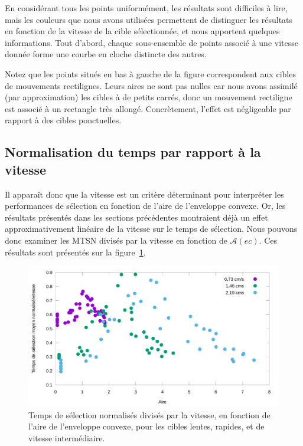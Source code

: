 	En considérant tous les points uniformément, les résultats sont difficiles à lire, mais les couleurs que nous avons utilisées permettent de distinguer les résultats en fonction de la vitesse de la cible sélectionnée, et nous apportent quelques informations. Tout d'abord, chaque sous-ensemble de points associé à une vitesse donnée forme une courbe \og en cloche \fg{} distincte des autres.
	
	Notez que les points situés en bas à gauche de la figure correspondent aux cibles de mouvements rectilignes. Leurs aires ne sont pas nulles car nous avons assimilé (par approximation) les cibles à de petits carrés, donc un mouvement rectiligne est associé à un rectangle très allongé. Concrètement, l'effet est négligeable par rapport à des cibles ponctuelles.
	
	\subsection{Normalisation du temps par rapport à la vitesse}
	Il apparaît donc que la vitesse est un critère déterminant pour interpréter les performances de sélection en fonction de l'aire de l'enveloppe convexe. Or, les résultats présentés dans les sections précédentes montraient déjà un effet approximativement linéaire de la vitesse sur le temps de sélection. Nous pouvons donc examiner les MTSN divisés par la vitesse en fonction de $\mathcal{A}(ec)$. Ces résultats sont présentés sur la figure~\ref{fig:perfVareaTimeNormedAll}.
	
	\begin{figure}[!htb]
		\centering
		\includegraphics[width=\textwidth]{figures/ch4/perfVareaTimeNormedAll}
		\caption[Temps de sélection/V en fonction de l'aire de l'enveloppe convexe]{Temps de sélection normalisés divisés par la vitesse, en fonction de l'aire de l'enveloppe convexe, pour les cibles lentes, rapides, et de vitesse intermédiaire.}
		\label{fig:perfVareaTimeNormedAll}
	\end{figure}
	
